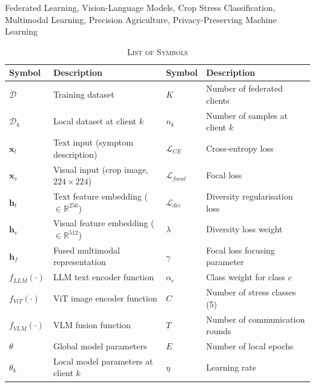 \documentclass[conference]{IEEEtran}
\begin{document}
\begin{IEEEkeywords}
Federated Learning, Vision-Language Models, Crop Stress Classification,
Multimodal Learning, Precision Agriculture, Privacy-Preserving Machine Learning
\end{IEEEkeywords}

\begin{table}[t]
\centering
\caption*{\small\textsc{List of Symbols}}
\vspace{-4pt}
{\footnotesize
\begin{tabular}{@{}p{1.3cm}p{5.6cm}@{\hskip 0.8cm}p{1.3cm}p{5.6cm}@{}}
\toprule
\textbf{Symbol} & \textbf{Description} & \textbf{Symbol} & \textbf{Description}\\
\midrule
$\mathcal{D}$         & Training dataset                                     & $K$                    & Number of federated clients \\
$\mathcal{D}_k$       & Local dataset at client $k$                          & $n_k$                  & Number of samples at client $k$ \\
$\mathbf{x}_t$        & Text input (symptom description)                     & $\mathcal{L}_{CE}$     & Cross-entropy loss \\
$\mathbf{x}_v$        & Visual input (crop image, $224{\times}224$)          & $\mathcal{L}_{focal}$  & Focal loss \\
$\mathbf{h}_t$        & Text feature embedding (${\in}\mathbb{R}^{256}$)    & $\mathcal{L}_{div}$    & Diversity regularisation loss \\
$\mathbf{h}_v$        & Visual feature embedding (${\in}\mathbb{R}^{512}$)  & $\lambda$              & Diversity loss weight \\
$\mathbf{h}_f$        & Fused multimodal representation                      & $\gamma$               & Focal loss focusing parameter \\
$f_{LLM}(\cdot)$      & LLM text encoder function                            & $\alpha_c$             & Class weight for class $c$ \\
$f_{ViT}(\cdot)$      & ViT image encoder function                           & $C$                    & Number of stress classes (5) \\
$f_{VLM}(\cdot)$      & VLM fusion function                                  & $T$                    & Number of communication rounds \\
$\theta$              & Global model parameters                              & $E$                    & Number of local epochs \\
$\theta_k$            & Local model parameters at client $k$                 & $\eta$                 & Learning rate \\
\bottomrule
\end{tabular}}
\vspace{2pt}
\end{table}
\end{document}
